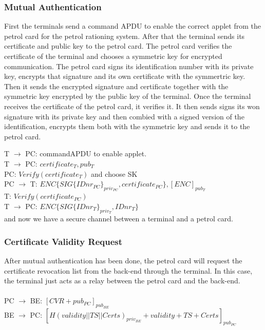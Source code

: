 \subsubsection{Mutual Authentication}
First the terminals send a command APDU to enable the correct applet from the petrol card for the petrol rationing system. After that the terminal sends its certificate and public key to the petrol card. The petrol card verifies the certificate of the terminal and chooses a symmetric key for encrypted communication. The petrol card signs its identification number with its private key, encrypts that signature and its own certificate with the symmertric key. Then it sends the encrypted signature and certificate together with the symmetric key encrypted by the public key of the terminal. Once the terminal receives the certificate of the petrol card, it verifies it. It then sends signs its won signature with its private key and then combied with a signed version of the identification, encrypts them both with the symmetric key and sends it to the petrol card.

T $\to$ PC: commandAPDU to enable applet.\\
T $\to$ PC: $certificate_{T}, pub_{T}$\\
PC: $Verify(certificate_{T})$ and choose SK\\
PC $\to$ T: $ENC\{SIG\{IDnr_{PC}\}_{priv_{PC}}, certificate_{PC}\},  [ENC]_{pub_T}$\\
T: $Verify(certificate_{PC})$\\
T $\to$ PC: $ENC\{SIG\{IDnr_{T}\}_{priv_T}, IDnr_{T}\}$
\\
and now we have a secure channel between a terminal and a petrol card.

\subsubsection{Certificate Validity Request}
After mutual authentication has been done, the petrol card will request the certificate revocation list from the back-end through the terminal. In this case, the terminal just acts as a relay between the petrol card and the back-end.
\\
\\
PC $\to$ BE: $[CVR + pub_{PC}]_{pub_{BE}}$\\
BE $\to$ PC: $[H(validity||TS||Certs)_{priv_{BE}}+validity+TS+Certs]_{pub_{PC}}$\\

